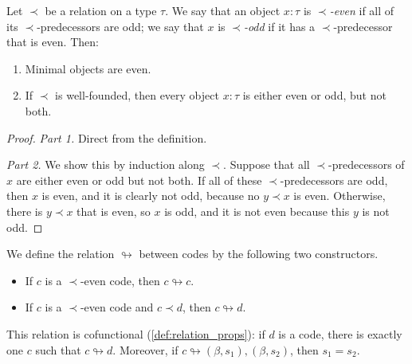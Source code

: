 \begin{proposition}
  \label{prop:odd_iff_not_even}
  Let \( \prec \) be a relation on a type \( \tau \).
  We say that an object \( x : \tau \) is \emph{\( \prec \)-even} if all of its \( \prec \)-predecessors are odd; we say that \( x \) is \emph{\( \prec \)-odd} if it has a \( \prec \)-predecessor that is even.
  Then:
  \begin{enumerate}
    \item Minimal objects are even.
    \item If \( \prec \) is well-founded, then every object \( x : \tau \) is either even or odd, but not both.
  \end{enumerate}
\end{proposition}
\begin{proof}
  \emph{Part 1.}
  Direct from the definition.

  \emph{Part 2.}
  We show this by induction along \( \prec \).
  Suppose that all \( \prec \)-predecessors of \( x \) are either even or odd but not both.
  If all of these \( \prec \)-predecessors are odd, then \( x \) is even, and it is clearly not odd, because no \( y \prec x \) is even.
  Otherwise, there is \( y \prec x \) that is even, so \( x \) is odd, and it is not even because this \( y \) is not odd.
\end{proof}
\begin{definition}
  \label{def:Code.Represents}
  We define the relation \( \looparrowright \) between codes by the following two constructors.
  \begin{itemize}
    \item If \( c \) is a \( \prec \)-even code, then \( c \looparrowright c \).
    \item If \( c \) is a \( \prec \)-even code and \( c \prec d \), then \( c \looparrowright d \).
  \end{itemize}
  This relation is cofunctional (\cref{def:relation_props}): if \( d \) is a code, there is exactly one \( c \) such that \( c \looparrowright d \).
  Moreover, if \( c \looparrowright (\beta, s_1), (\beta, s_2) \), then \( s_1 = s_2 \).
\end{definition}
